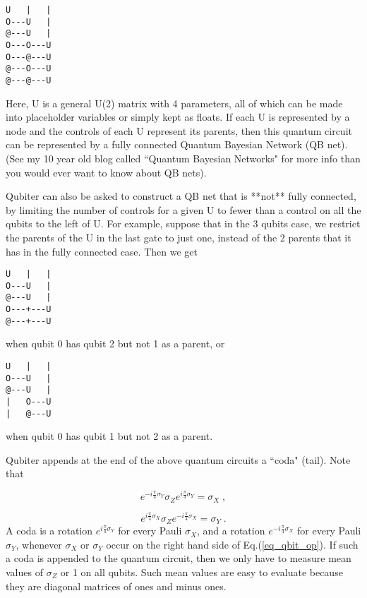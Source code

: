\documentclass[12pt]{article}
\newcommand{\beq}{\begin{equation}}
\newcommand{\eeq}{\end{equation}}
\begin{document}
{\begin{verbatim}
U   |   |
O---U   |
@---U   |
O---O---U
O---@---U
@---O---U
@---@---U
\end{verbatim}

Here, U is a general U(2) matrix with 4 parameters,
all of which can be
made into placeholder variables
or simply kept as floats. If each U is represented by a node and
the controls of each U represent
 its parents, then this quantum circuit
can be represented by a fully connected
Quantum Bayesian Network (QB
net). (See my 10 year old blog called ``Quantum Bayesian Networks" for
more info than you would ever want to know about QB nets).

Qubiter can also be asked to
construct a QB net that is **not** fully
connected, by limiting the number
 of controls for a given U to fewer
than a control on all the qubits to
the left of U.
For example, suppose that in the
3 qubits case, we restrict the
 parents of the U in the last gate to
just one, instead of the 2 parents
 that it has in the fully connected
case. Then we get

\begin{verbatim}
U   |   |
O---U   |
@---U   |
O---+---U
@---+---U
\end{verbatim}
when qubit 0 has qubit 2 but not 1 as a parent,
or

\begin{verbatim}
U   |   |
O---U   |
@---U   |
|   O---U
|   @---U
\end{verbatim}
when qubit 0 has qubit 1 but not 2 as a parent.


Qubiter appends at the end
of  the above
quantum circuits a ``coda" (tail).
Note that

\beq
e^{-i\frac{\pi}{4}\sigma_Y}\sigma_Z
e^{i\frac{\pi}{4}\sigma_Y} =\sigma_X
\;,
\eeq

\beq
e^{i\frac{\pi}{4}\sigma_X}\sigma_Z
e^{-i\frac{\pi}{4}\sigma_X} =\sigma_Y
\;.
\eeq
A coda is a rotation
$e^{i\frac{\pi}{4}\sigma_Y}$ for every
Pauli $\sigma_X$,
and a rotation
$e^{-i\frac{\pi}{4}\sigma_X}$
for every Pauli $\sigma_Y$,
whenever
$\sigma_X$ or $\sigma_Y$
occur on the right hand side
of Eq.(\ref{eq_qbit_op}).
If such a coda is appended to
the quantum circuit,
then we only have to
measure mean values
of $\sigma_Z$ or 1 on all qubits.
Such mean values
are easy to evaluate because
they are diagonal
matrices of ones and minus ones.

}
\end{document}
